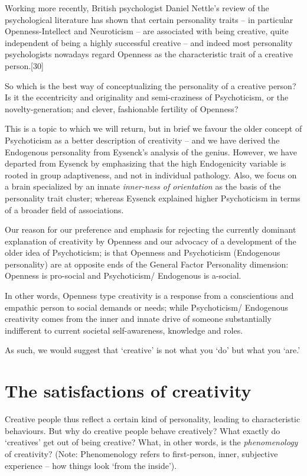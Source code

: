 \documentclass[
]{book}
\begin{document}
Working more recently, British psychologist Daniel Nettle's review of the psychological literature has shown that certain personality traits -- in particular Openness-Intellect and Neuroticism -- are associated with being creative, quite independent of being a highly successful creative -- and indeed most personality psychologists nowadays regard Openness as the characteristic trait of a creative person.{[}30{]}

So which is the best way of conceptualizing the personality of a creative person? Is it the eccentricity and originality and semi-craziness of Psychoticism, or the novelty-generation; and clever, fashionable fertility of Openness?

This is a topic to which we will return, but in brief we favour the older concept of Psychoticism as a better description of creativity -- and we have derived the Endogenous personality from Eysenck's analysis of the genius. However, we have departed from Eysenck by emphasizing that the high Endogenicity variable is rooted in group adaptiveness, and not in individual pathology. Also, we focus on a brain specialized by an innate \emph{inner-ness of orientation} as the basis of the personality trait cluster; whereas Eysenck explained higher Psychoticism in terms of a broader field of associations.

Our reason for our preference and emphasis for rejecting the currently dominant explanation of creativity by Openness and our advocacy of a development of the older idea of Psychoticism; is that Openness and Psychoticism (Endogenous personality) are at opposite ends of the General Factor Personality dimension: Openness is pro-social and Psychoticism/ Endogenous is a-social.

In other words, Openness type creativity is a response from a conscientious and empathic person to social demands or needs; while Psychoticism/ Endogenous creativity comes from the inner and innate drive of someone substantially indifferent to current societal self-awareness, knowledge and roles.

As such, we would suggest that `creative' is not what you `do' but what you `are.'

\hypertarget{the-satisfactions-of-creativity}{%
\section{The satisfactions of creativity}\label{the-satisfactions-of-creativity}}

Creative people thus reflect a certain kind of personality, leading to characteristic behaviours. But why do creative people behave creatively? What exactly do `creatives' get out of being creative? What, in other words, is the \emph{phenomenology} of creativity? (Note: Phenomenology refers to first-person, inner, subjective experience -- how things look `from the inside').
\end{document}
